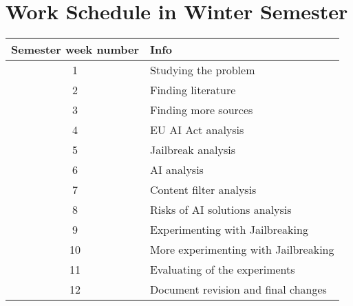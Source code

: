 \setcounter{figure}{0}
\setcounter{listing}{0}

\chapter{Work Schedule in Winter Semester \label{cha:chapter1} }



\begin{table}[h]
    \centering
    \begin{tabular}{|c|l|}
    \hline
    \textbf{Semester week number} & \textbf{Info} \\ \hline

    1 & Studying the problem  \\ \hline
    2 & Finding literature \\ \hline
    3 & Finding more sources \\ \hline
    4 & EU AI Act analysis \\ \hline
    5 & Jailbreak analysis \\ \hline
    6 & AI analysis \\ \hline
    7 & Content filter analysis \\ \hline
    8 & Risks of AI solutions analysis \\ \hline
    9 & Experimenting with Jailbreaking \\ \hline
    10 & More experimenting with Jailbreaking \\ \hline
    11 & Evaluating of the experiments \\ \hline
    12 & Document revision and final changes \\ \hline
    \end{tabular}
\end{table}


\begin{refsegment}

% 

\printbibliography[heading=referencessec,segment=\therefsegment,resetnumbers=true]

\end{refsegment}